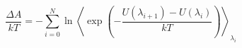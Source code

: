 


\[ \frac{\Delta A}{kT} = - \sum_{i=0}^N \ln \left< \exp \left( -
    \frac{U(\lambda_{i+1}) - U(\lambda_i)}{kT} \right)
\right>_{\lambda_i} \]


